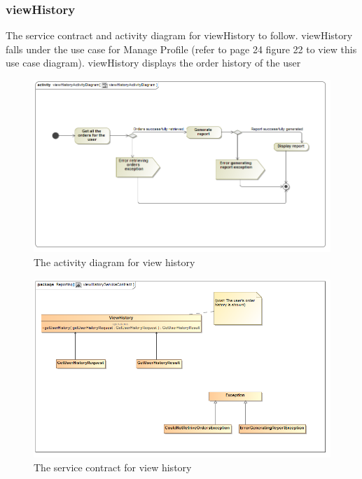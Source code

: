 \documentclass[a4paper,12pt]{report}
\begin{document}
\subsubsection{viewHistory}
The service contract and activity diagram for viewHistory to follow. viewHistory falls under the use case for Manage Profile (refer to page 24 figure 22 to view this use case diagram). viewHistory displays the order history of the user
\begin{figure}[H]
  \centering
    \includegraphics[width=1.0\textwidth]{../images/viewHistoryActivityDiagram.png}
    \caption{The activity diagram for view history} 
\end{figure}

\begin{figure}[H]
	\centering
	\includegraphics[width=1.0\textwidth]{../images/viewHistoryServiceContract.png}
	\caption{The service contract for view history}
\end{figure}
\end{document}
